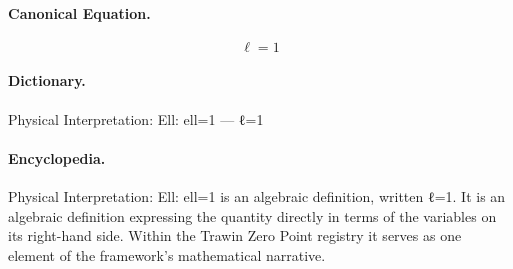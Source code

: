 \paragraph{Canonical Equation.}
\[
\ell=1
\]

\paragraph{Dictionary.}
Physical Interpretation: Ell: ell=1 — ℓ=1

\paragraph{Encyclopedia.}
Physical Interpretation: Ell: ell=1 is an algebraic definition, written ℓ=1. It is an algebraic definition expressing the quantity directly in terms of the variables on its right-hand side. Within the Trawin Zero Point registry it serves as one element of the framework's mathematical narrative.
